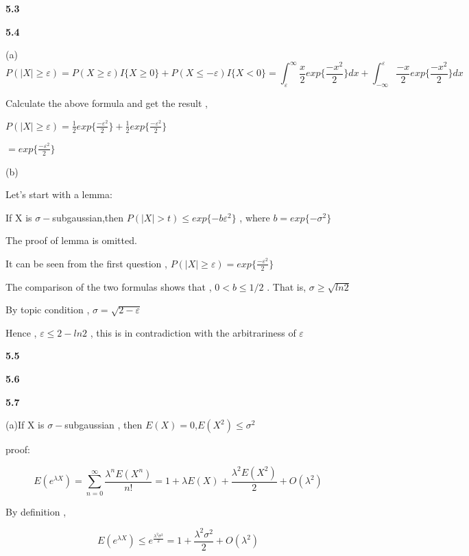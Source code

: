 \noindent\textbf{5.3}



\noindent\textbf{5.4}



(a)
\begin{equation}
P(|X|\geq \varepsilon) = P(X\geq\varepsilon)I\{X\geq 0\}+P(X\leq -\varepsilon)I\{X< 0\}
=\int_{\varepsilon}^{\infty} \frac{x}{2} exp\{ \frac{-x^2}{2}\} dx + \int_{-\infty}^{\varepsilon} \frac{-x}{2} exp\{ \frac{-x^2}{2}\} dx
\end{equation}

Calculate the above formula and get the result ,

$P(|X|\geq \varepsilon) =\frac{1}{2} exp\{ \frac{-\varepsilon^2}{2}\} + \frac{1}{2} exp\{ \frac{-\varepsilon^2}{2}\}$

$=exp\{ \frac{-\varepsilon^2}{2}\}$


(b)

Let's start with a lemma:

If X is $\sigma-$subgaussian,then $P(|X|>t) \leq exp\{ -b \varepsilon^2\}$ , where $b=exp\{ -\sigma^2\}$

The proof of lemma is omitted.

It can be seen from the first question , $P(|X|\geq \varepsilon) = exp\{ \frac{-\varepsilon^2}{2}\}$

The comparison of the two formulas shows that , $0<b\leq 1/2$ . That is, $\sigma\geq \sqrt{ln2}$

By topic condition , $\sigma = \sqrt{2-\varepsilon}$

Hence , $\varepsilon \leq 2-ln2$ , this is in contradiction with the arbitrariness of $\varepsilon$


\noindent\textbf{5.5}



\noindent\textbf{5.6}


\noindent\textbf{5.7}


(a)If X is $\sigma-$subgaussian , then $E(X)=0$,$E(X^2)\leq\sigma^2$

proof:

\begin{equation}
E(e^{\lambda X}) = \sum_{n=0}^{\infty}\frac{\lambda^n E(X^n)}{n!}=1+\lambda E(X)+\frac{\lambda^2 E(X^2)}{2}+O(\lambda^2)
\end{equation}

By definition ,

\begin{equation}
E(e^{\lambda X})\leq e^{\frac{\lambda^2 \sigma^2}{2}}=1+\frac{\lambda^2 \sigma^2}{2}+O(\lambda^2)
\end{equation}


